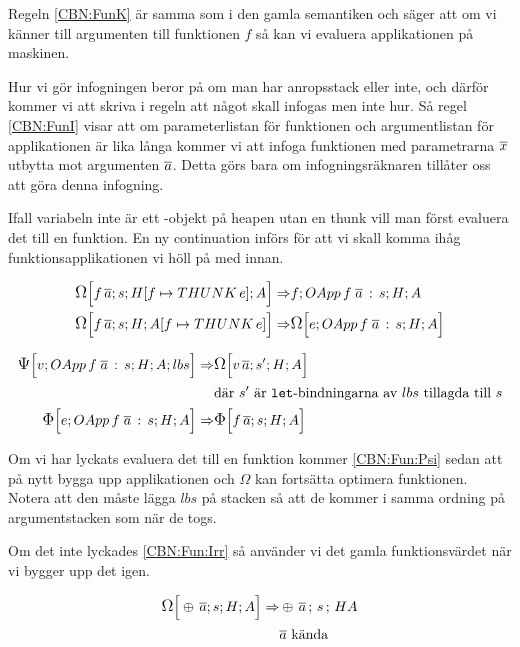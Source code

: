 \documentclass[../Optimise]{subfiles}
\begin{document}
Regeln \eqref{CBN:FunK} är samma som i den gamla semantiken och säger att om vi känner till
argumenten till funktionen $f$ så kan vi evaluera applikationen på maskinen. 

Hur vi gör infogningen beror på om man har anropsstack eller inte, och därför kommer vi
att skriva i regeln att något skall infogas men inte hur. Så regel \eqref{CBN:FunI}
visar att om parameterlistan för funktionen och argumentlistan för applikationen är
lika långa kommer vi att infoga funktionen med parametrarna $\many{x}$ utbytta mot
argumenten $\many{a}$. Detta görs bara om infogningsräknaren tillåter oss att göra 
denna infogning.

Ifall variabeln inte är ett -objekt på heapen utan en thunk vill man först evaluera
det till en funktion. En ny continuation  införs för att vi skall komma ihåg
funktionsapplikationen vi höll på med innan.

\begin{align}
\CBNOMEGA s{\heap f{\THUNK e}}A{f\, \many{a}}  \Rightarrow & \CBNMC f{\cOApp f{\many{a}}s}HA\\
\CBNOMEGA sH{\abyss f{\THUNK e}}{f\, \many{a}}  \Rightarrow & \CBNOMEGA{\cOApp f{\many{a}}s}HAe
\end{align}

\begin{align}
\label{CBN:Fun:Psi}\CBNPSI{\cOApp f{\many{a}}s}HA{lbs}v  \Rightarrow & \CBNOMEGA {s'}HA{v\, \many{a}} \\
 & \text{där } s' \text{ är \kw{let}-bindningarna av } lbs \text{ tillagda till } s \nonumber \\
\label{CBN:Fun:Irr}\CBNIRR {\cOApp f {\many{a}}s}HAe  \Rightarrow & \CBNIRR sHA{f\, \many{a}}
\end{align}

Om vi har lyckats evaluera det till en funktion kommer \eqref{CBN:Fun:Psi} sedan att
på nytt bygga upp applikationen och $\Omega$ kan fortsätta optimera funktionen.
Notera att den måste lägga $lbs$ på stacken så att de kommer i samma ordning på 
argumentstacken som när de togs.

Om det inte lyckades \eqref{CBN:Fun:Irr} så använder vi det gamla funktionsvärdet
när vi bygger upp det igen.

\begin{align}
\CBNOMEGA sHA{\oplus\, \many{a}}  \Rightarrow & \mc{\oplus\, \many{a}}sHA \\
 & \many{a} \text{ kända } \nonumber
\end{align}
\end{document}
